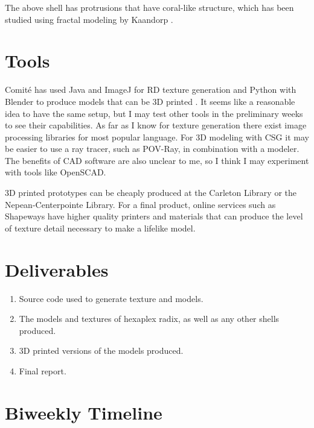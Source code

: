 The above shell has protrusions that have coral-like structure, which has been studied using fractal modeling by Kaandorp \cite{fmgfb}.

\section*{Tools}

Comité has used Java and ImageJ for RD texture generation and Python with Blender to produce models that can be 3D printed \cite{3dprinting-seashells}. It seems like a reasonable idea to have the same setup, but I may test other tools in the preliminary weeks to see their capabilities. As far as I know for texture generation there exist image processing libraries for most popular language. For 3D modeling with CSG it may be easier to use a ray tracer, such as POV-Ray, in combination with a modeler. The benefits of CAD software are also unclear to me, so I think I may experiment with tools like OpenSCAD.

3D printed prototypes can be cheaply produced at the Carleton Library or the Nepean-Centerpointe Library. For a final product, online services such as Shapeways have higher quality printers and materials that can produce the level of texture detail necessary to make a lifelike model.

\section*{Deliverables}

\begin{enumerate}
	\item{
		Source code used to generate texture and models.
	}
	\item{
		The models and textures of hexaplex radix, as well as any other shells produced.
	}
	\item{
		3D printed versions of the models produced.
	}
	\item{
		Final report.
	}
\end{enumerate}

\section*{Biweekly Timeline}

